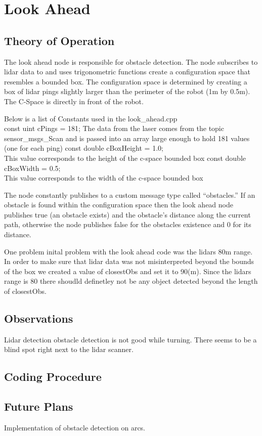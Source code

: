 \documentclass{article}
\begin{document}
\section{Look Ahead}

\subsection{Theory of Operation}

The look ahead node is responsible for obstacle detection. The node subscribes to lidar data to and uses trigonometric functions create a configuration space that resembles a bounded box. The configuration space is determined by creating a box of lidar pings slightly larger than the perimeter of the robot (1m by 0.5m). The C-Space is directly in front of the robot. 

Below is a list of Constants used in the look_ahead.cpp\\
const uint cPings = 181; The data from the laser comes from the topic sensor_msgs\Laser_Scan and is passed into an array large enough to hold 181 values (one for each ping)
const double cBoxHeight = 1.0;\\ This value corresponds to the height of the c-space bounded box
const double cBoxWidth = 0.5; \\ This value corresponds to the width of the c-space bounded box

The node constantly publishes to a custom message type called ``obstacles.'' If an obstacle is found within the configuration space then the look ahead node publishes true (an obstacle exists) and the obstacle's distance along the current path, otherwise the node publishes false for the obstacles existence and 0 for its distance. 

One problem inital problem with the look ahead code was the lidars 80m range. In order to make sure that lidar data was not misinterpreted beyond the bounds of the box we created a value of closestObs and set it to 90(m). Since the lidars range is 80 there shoudld definetley not be any object detected beyond the length of closestObs.







\subsection{Observations}
Lidar detection obstacle detection is not good while turning. There seems to be a blind spot right next to the lidar scanner.

\subsection{Coding Procedure}

\subsection{Future Plans}
Implementation of obstacle detection on arcs.
\end{document}
